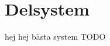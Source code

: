 \documentclass[designspec/spec.tex]{subfiles}
\begin{document}
\section{Delsystem}
hej hej bästa system TODO





\end{document}
